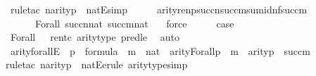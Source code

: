 \begin{isabellebody}
\ {\isacharparenleft}{\kern0pt}rule{\isacharunderscore}{\kern0pt}tac\ n{\isacharequal}{\kern0pt}{\isachardoublequoteopen}arity{\isacharparenleft}{\kern0pt}p{\isacharparenright}{\kern0pt}{\isachardoublequoteclose}\ \ natE{\isacharcomma}{\kern0pt}simp{\isacharplus}{\kern0pt}{\isacharparenright}{\kern0pt}\isanewline
\ \ \isamarkupfalse%
\ \isamarkupfalse%
\ {\isachardoublequoteopen}arity{\isacharparenleft}{\kern0pt}ren{\isacharparenleft}{\kern0pt}p{\isacharparenright}{\kern0pt}{\isacharbackquote}{\kern0pt}succ{\isacharparenleft}{\kern0pt}n{\isacharparenright}{\kern0pt}{\isacharbackquote}{\kern0pt}succ{\isacharparenleft}{\kern0pt}m{\isacharparenright}{\kern0pt}{\isacharbackquote}{\kern0pt}sum{\isacharunderscore}{\kern0pt}id{\isacharparenleft}{\kern0pt}n{\isacharcomma}{\kern0pt}f{\isacharparenright}{\kern0pt}{\isacharparenright}{\kern0pt}{\isasymle}succ{\isacharparenleft}{\kern0pt}m{\isacharparenright}{\kern0pt}{\isachardoublequoteclose}\ \isamarkupfalse%
\isanewline
\ \ \ \ \ \ Forall\ {\isacartoucheopen}succ{\isacharparenleft}{\kern0pt}n{\isacharparenright}{\kern0pt}{\isasymin}nat{\isacartoucheclose}\ {\isacartoucheopen}succ{\isacharparenleft}{\kern0pt}m{\isacharparenright}{\kern0pt}{\isasymin}nat{\isacartoucheclose}\ {}\ \isamarkupfalse%
\ force\isanewline
\ \ \isamarkupfalse%
\ \isamarkupfalse%
\ {\isacharquery}{\kern0pt}case\ \isamarkupfalse%
\ Forall\ {}\ {}\ ren{\isacharunderscore}{\kern0pt}tc\ arity{\isacharunderscore}{\kern0pt}type\ pred{\isacharunderscore}{\kern0pt}le\ \isamarkupfalse%
\ auto\isanewline
{}\isamarkupfalse%
%
\endisatagproof
{\isafoldproof}%
%
\isadelimproof
\isanewline
%
\endisadelimproof
\isanewline
{}\isamarkupfalse%
\ arity{\isacharunderscore}{\kern0pt}forallE\ {\isacharcolon}{\kern0pt}\ {\isachardoublequoteopen}p\ {\isasymin}\ formula\ {\isasymLongrightarrow}\ m\ {\isasymin}\ nat\ {\isasymLongrightarrow}\ arity{\isacharparenleft}{\kern0pt}Forall{\isacharparenleft}{\kern0pt}p{\isacharparenright}{\kern0pt}{\isacharparenright}{\kern0pt}\ {\isasymle}\ m\ {\isasymLongrightarrow}\ arity{\isacharparenleft}{\kern0pt}p{\isacharparenright}{\kern0pt}\ {\isasymle}\ succ{\isacharparenleft}{\kern0pt}m{\isacharparenright}{\kern0pt}{\isachardoublequoteclose}\isanewline
%
\isadelimproof
\ \ %
\endisadelimproof
%
\isatagproof
{}\isamarkupfalse%
{\isacharparenleft}{\kern0pt}rule{\isacharunderscore}{\kern0pt}tac\ n{\isacharequal}{\kern0pt}{\isachardoublequoteopen}arity{\isacharparenleft}{\kern0pt}p{\isacharparenright}{\kern0pt}{\isachardoublequoteclose}\ \ natE{\isacharcomma}{\kern0pt}erule\ arity{\isacharunderscore}{\kern0pt}type{\isacharcomma}{\kern0pt}simp{\isacharplus}{\kern0pt}{\isacharparenright}{\kern0pt}%

\end{isabellebody}
